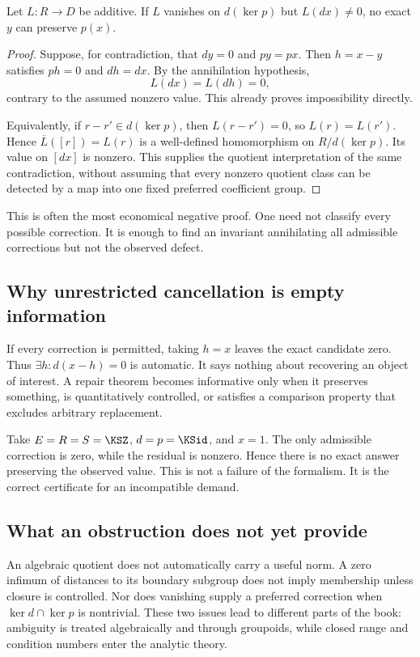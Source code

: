 \begin{KSproposition}\label{KS:KS15}
Let \(L:R\to D\) be additive. If \(L\) vanishes on \(d(\ker p)\) but \(L(dx)\ne0\), no exact \(y\) can preserve \(p(x)\).
\end{KSproposition}
\begin{proof}
Suppose, for contradiction, that $dy=0$ and $py=px$. Then $h=x-y$ satisfies $ph=0$ and $dh=dx$. By the annihilation hypothesis,
\[
 L(dx)=L(dh)=0,
\]
contrary to the assumed nonzero value. This already proves impossibility directly.

Equivalently, if $r-r'\in d(\ker p)$, then $L(r-r')=0$, so $L(r)=L(r')$. Hence $\overline L([r])=L(r)$ is a well-defined homomorphism on $R/d(\ker p)$. Its value on $[dx]$ is nonzero. This supplies the quotient interpretation of the same contradiction, without assuming that every nonzero quotient class can be detected by a map into one fixed preferred coefficient group.
\end{proof}
This is often the most economical negative proof. One need not classify every possible correction. It is enough to find an invariant annihilating all admissible corrections but not the observed defect.

\subsection{Why unrestricted cancellation is empty information}
If every correction is permitted, taking \(h=x\) leaves the exact candidate zero. Thus \(\exists h:d(x-h)=0\) is automatic. It says nothing about recovering an object of interest. A repair theorem becomes informative only when it preserves something, is quantitatively controlled, or satisfies a comparison property that excludes arbitrary replacement.

\begin{KSexample}
Take \(E=R=S=\KSZ\), \(d=p=\KSid\), and \(x=1\). The only admissible correction is zero, while the residual is nonzero. Hence there is no exact answer preserving the observed value. This is not a failure of the formalism. It is the correct certificate for an incompatible demand.
\end{KSexample}

\subsection{What an obstruction does not yet provide}
An algebraic quotient does not automatically carry a useful norm. A zero infimum of distances to its boundary subgroup does not imply membership unless closure is controlled. Nor does vanishing supply a preferred correction when \(\ker d\cap\ker p\) is nontrivial. These two issues lead to different parts of the book: ambiguity is treated algebraically and through groupoids, while closed range and condition numbers enter the analytic theory.

